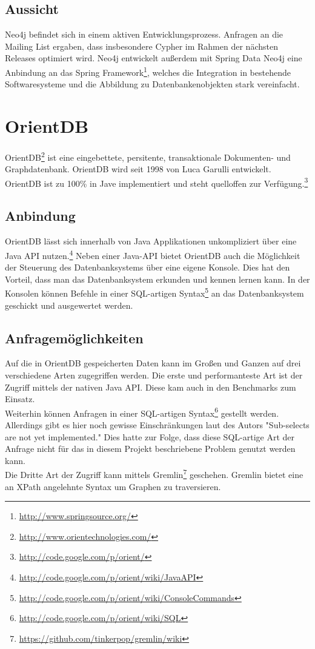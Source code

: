 \documentclass[11pt, a4paper, oneside]{article} %
\begin{document}
\subsection{Aussicht}

Neo4j befindet sich in einem aktiven Entwicklungsprozess. Anfragen an die Mailing List ergaben, dass insbesondere Cypher im Rahmen der nächsten Releases optimiert wird. Neo4j entwickelt außerdem mit Spring Data Neo4j eine Anbindung an das Spring Framework\footnote{\url{http://www.springsource.org/}}, welches die Integration in bestehende Softwaresysteme und die Abbildung zu Datenbankenobjekten stark vereinfacht.

\section{OrientDB}

OrientDB\footnote{\url{http://www.orientechnologies.com/}} ist eine eingebettete, persitente, transaktionale Dokumenten- und Graphdatenbank. OrientDB wird seit 1998 von Luca Garulli entwickelt. OrientDB ist zu 100\% in Jave implementiert und steht quelloffen zur Verfügung.\footnote{\url{http://code.google.com/p/orient/}}

\subsection{Anbindung}

OrientDB lässt sich innerhalb von Java Applikationen unkompliziert über eine Java API nutzen.\footnote{\url{http://code.google.com/p/orient/wiki/JavaAPI}} Neben einer Java-API bietet OrientDB auch die Möglichkeit der Steuerung des Datenbanksystems über eine eigene Konsole. Dies hat den Vorteil, dass man das Datenbanksystem erkunden und kennen lernen kann. In der Konsolen können Befehle in einer SQL-artigen Syntax\footnote{\url{http://code.google.com/p/orient/wiki/ConsoleCommands}} an das Datenbanksystem geschickt und ausgewertet werden.

\subsection{Anfragemöglichkeiten}
Auf die in OrientDB gespeicherten Daten kann im Großen und Ganzen auf drei verschiedene Arten zugegriffen werden. Die erste und performanteste Art ist der Zugriff mittels der nativen Java API. Diese kam auch in den Benchmarks zum Einsatz. \\
Weiterhin können Anfragen in einer SQL-artigen Syntax\footnote{\url{http://code.google.com/p/orient/wiki/SQL}} gestellt werden. Allerdings gibt es hier noch gewisse Einschränkungen laut des Autors "Sub-selects are not yet implemented." Dies hatte zur Folge, dass diese SQL-artige Art der Anfrage nicht für das in diesem Projekt beschriebene Problem genutzt werden kann. \\
Die Dritte Art der Zugriff kann mittels Gremlin\footnote{\url{https://github.com/tinkerpop/gremlin/wiki}} geschehen. Gremlin bietet eine an XPath angelehnte Syntax um Graphen zu traversieren.
\end{document}
